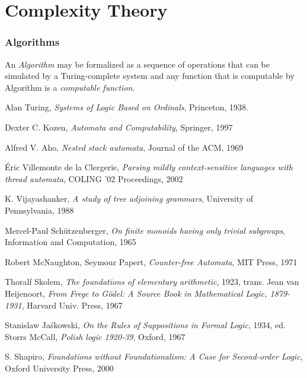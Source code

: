 \documentclass{article}
\begin{document}
\part{Complexity Theory}

\section{Algorithms}

An \emph{Algorithm} may be formalized as a sequence of operations that
can be simulated by a Turing-complete system and any function
that is computable by Algorithm is a \emph{computable function}.

\begin{thebibliography}{9}

    Alan Turing,
    \emph{Systems of Logic Based on Ordinals},
    Princeton,
    1938.

    Dexter C. Kozen,
    \emph{Automata and Computability},
    Springer,
    1997

    Alfred V. Aho,
    \emph{Nested stack automata},
    Journal of the ACM,
    1969

    \'Eric Villemonte de la Clergerie,
    \emph{Parsing mildly context-sensitive languages with thread automata},
    COLING '02 Proceedings,
    2002

    K. Vijayashanker,
    \emph{A study of tree adjoining grammars},
    University of Pennsylvania,
    1988

    Mercel-Paul Sch\"utzenberger,
    \emph{On finite monoids having only trivial subgroups},
    Information and Computation,
    1965

    Robert McNaughton, Seymour Papert,
    \emph{Counter-free Automata},
    MIT Press,
    1971

    Thoralf Skolem,
    \emph{The foundations of elementary arithmetic},
    1923,
    trans. Jean van Heijenoort,
    \emph{From Frege to G\"odel: A Source Book in Mathematical Logic, 1879-1931},
    Harvard Univ. Press,
    1967

    Stanislaw Ja\'skowski,
    \emph{On the Rules of Suppositions in Formal Logic},
    1934,
    ed. Storrs McCall,
    \emph{Polish logic 1920-39},
    Oxford,
    1967

    S. Shapiro,
    \emph{Foundations without Foundationalism: A Case for Second-order
    Logic},
    Oxford University Press,
    2000

\end{thebibliography}
\end{document}
